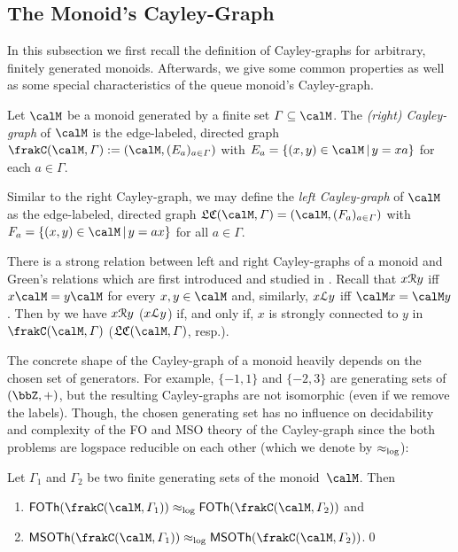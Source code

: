 \subsection{The Monoid's Cayley-Graph}
In this subsection we first recall the definition of Cayley-graphs for arbitrary, finitely generated monoids. Afterwards, we give some common properties as well as some special characteristics of the queue monoid's Cayley-graph.

\begin{definition}
	Let $\calM$ be a monoid generated by a finite set $\varGamma\subseteq\calM$. The \emph{(right) Cayley-graph} of $\calM$ is the edge-labeled, directed graph $\cayley{\calM}{\varGamma}:=(\calM,(E_a)_{a\in\varGamma})$ with
	$E_a=\{(x,y)\in\calM\,|\,y=xa\}$
	for each $a\in\varGamma$.
\end{definition}

Similar to the right Cayley-graph, we may define the \emph{left Cayley-graph} of $\calM$ as the edge-labeled, directed graph $\lcayley{\calM}{\varGamma}=(\calM,(F_a)_{a\in\varGamma})$ with $F_a=\{(x,y)\in\calM\,|\,y=ax\}$ for all $a\in\varGamma$.

\begin{remark}
	There is a strong relation between left and right Cayley-graphs of a monoid and Green's relations which are first introduced and studied in \cite{Gre51}. Recall that $x\mathcal{R} y$ iff $x\calM=y\calM$ for every $x,y\in\calM$ and, similarly, $x\mathcal{L} y$ iff $\calM x=\calM y$. Then by \cite[Proposition V.1.1]{pin2010} we have $x\mathcal{R} y$ ($x\mathcal{L} y$) if, and only if, $x$ is strongly connected to $y$ in $\cayley{\calM}{\varGamma}$ ($\lcayley{\calM}{\varGamma}$, resp.).
\end{remark}

The concrete shape of the Cayley-graph of a monoid heavily depends on the chosen set of generators. For example, $\{-1,1\}$ and $\{-2,3\}$ are generating sets of $(\bbZ,+)$, but the resulting Cayley-graphs are not isomorphic (even if we remove the labels). Though, the chosen generating set has no influence on decidability and complexity of the FO and MSO theory of the Cayley-graph since the both problems are logspace reducible on each other (which we denote by $\approx_{\operatorname{log}}$):

\begin{proposition}
	Let $\varGamma_1$ and $\varGamma_2$ be two finite generating sets of the monoid~$\calM$. Then
	\begin{enumerate}[(1)]
		\item $\FOTh{\cayley{\calM}{\varGamma_1}}\eqlog\FOTh{\cayley{\calM}{\varGamma_2}}$ and
		\item $\MSOTh{\cayley{\calM}{\varGamma_1}}\eqlog\MSOTh{\cayley{\calM}{\varGamma_2}}$.\qed
	\end{enumerate}
\end{proposition}

